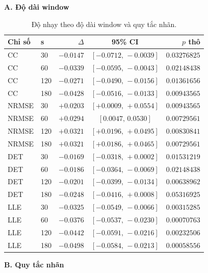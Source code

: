 \documentclass[conference,a4paper]{IEEEtran}
\renewcommand{\thetable}{S\arabic{table}}
\begin{document}
\begin{table}[!t]
\renewcommand{\thetable}{S\arabic{table}A}
\centering
\caption{Độ nhạy theo độ dài window và quy tắc nhãn.}\label{tab:supp_sensitivity}
\footnotesize
\setlength{\tabcolsep}{1.5pt}
\renewcommand{\arraystretch}{1.12}
\begin{minipage}[t]{0.49\textwidth}
\raggedright\textbf{A. Độ dài window}\par\smallskip
\begin{tabular*}{\linewidth}{@{\extracolsep{\fill}}llrcr@{}}
\toprule
Chỉ số & s & $\Delta$ & 95\% CI & $p$ thô\\
\midrule
CC & 30 & $-0.0147$ & $[-0.0712,\,-0.0039]$ & $0.03276825$\\
CC & 60 & $-0.0339$ & $[-0.0595,\,-0.0043]$ & $0.02148438$\\
CC & 120 & $-0.0271$ & $[-0.0490,\,-0.0156]$ & $0.01361656$\\
CC & 180 & $-0.0428$ & $[-0.0516,\,-0.0133]$ & $0.00943565$\\
NRMSE & 30 & $+0.0203$ & $[+0.0009,\,+0.0554]$ & $0.00943565$\\
NRMSE & 60 & $+0.0294$ & $[0.0047,\,0.0530]$ & $0.00729561$\\
NRMSE & 120 & $+0.0321$ & $[+0.0196,\,+0.0495]$ & $0.00830841$\\
NRMSE & 180 & $+0.0321$ & $[+0.0186,\,+0.0465]$ & $0.00729561$\\
DET & 30 & $-0.0169$ & $[-0.0318,\,+0.0002]$ & $0.01531219$\\
DET & 60 & $-0.0186$ & $[-0.0364,\,-0.0069]$ & $0.02148438$\\
DET & 120 & $-0.0201$ & $[-0.0399,\,-0.0134]$ & $0.00638962$\\
DET & 180 & $-0.0248$ & $[-0.0416,\,+0.0008]$ & $0.05316925$\\
LLE & 30 & $-0.0325$ & $[-0.0549,\,-0.0066]$ & $0.00315285$\\
LLE & 60 & $-0.0376$ & $[-0.0537,\,-0.0230]$ & $0.00070763$\\
LLE & 120 & $-0.0442$ & $[-0.0591,\,-0.0216]$ & $0.00232506$\\
LLE & 180 & $-0.0498$ & $[-0.0584,\,-0.0213]$ & $0.00058556$\\
\bottomrule
\end{tabular*}
\end{minipage}\hfill\begin{minipage}[t]{0.49\textwidth}
\raggedright\textbf{B. Quy tắc nhãn}\par\smallskip

\end{minipage}
\end{table}
\end{document}
